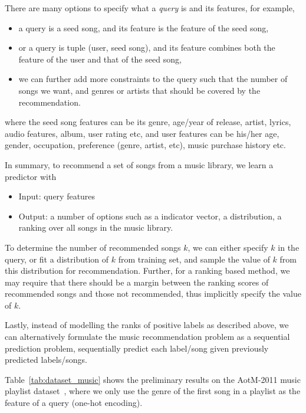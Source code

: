There are many options to specify what a \emph{query} is and its features, for example,
\begin{itemize}
\item a query is a seed song, and its feature is the feature of the seed song,
\item or a query is tuple (user, seed song), and its feature combines both the feature of the user and that of the seed song,
\item we can further add more constraints to the query such that the number of songs we want, 
      and genres or artists that should be covered by the recommendation.
\end{itemize}
where the seed song features can be its genre, age/year of release, artist, lyrics, audio features, album, user rating etc,
and user features can be his/her age, gender, occupation, preference (genre, artist, etc), music purchase history etc.

In summary, to recommend a set of songs from a music library, we learn a predictor with
\begin{itemize}
\item Input: query features
\item Output: a number of options such as a indicator vector, a distribution, a ranking over all songs in the music library.
\end{itemize}
To determine the number of recommended songs $k$, we can either specify $k$ in the query,
or fit a distribution of $k$ from training set, and sample the value of $k$ from this distribution for recommendation.
Further, for a ranking based method, we may require that there should be a margin between the ranking scores of recommended songs and 
those not recommended, thus implicitly specify the value of $k$.

Lastly, instead of modelling the ranks of positive labels as described above, 
we can alternatively formulate the music recommendation problem as a sequential prediction problem,
\ie sequentially predict each label/song given previously predicted labels/songs.

Table~\ref{tab:dataset_music} shows the preliminary results on the AotM-2011 music playlist dataset~\cite{mcfee2012},
where we only use the genre of the first song in a playlist as the feature of a query (one-hot encoding).

